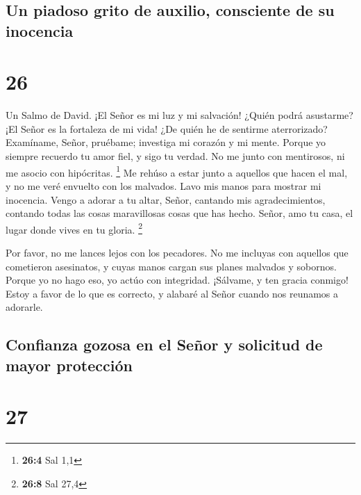 \hypertarget{un-piadoso-grito-de-auxilio-consciente-de-su-inocencia}{%
\subsection{Un piadoso grito de auxilio, consciente de su
inocencia}\label{un-piadoso-grito-de-auxilio-consciente-de-su-inocencia}}

\hypertarget{section-25}{%
\section{26}\label{section-25}}

Un Salmo de David.  ¡El Señor es mi luz y mi salvación!
¿Quién podrá asustarme? ¡El Señor es la fortaleza de mi vida! ¿De quién
he de sentirme aterrorizado?  Examíname, Señor, pruébame;
investiga mi corazón y mi mente.  Porque yo siempre recuerdo
tu amor fiel, y sigo tu verdad.  No me junto con mentirosos,
ni me asocio con hipócritas. \footnote{\textbf{26:4} Sal 1,1}
 Me rehúso a estar junto a aquellos que hacen el mal, y no
me veré envuelto con los malvados.  Lavo mis manos para
mostrar mi inocencia. Vengo a adorar a tu altar, Señor, 
cantando mis agradecimientos, contando todas las cosas maravillosas
cosas que has hecho.  Señor, amo tu casa, el lugar donde
vives en tu gloria. \footnote{\textbf{26:8} Sal 27,4}

 Por favor, no me lances lejos con los pecadores. No me
incluyas con aquellos que cometieron asesinatos,  y cuyas
manos cargan sus planes malvados y sobornos.  Porque yo no
hago eso, yo actúo con integridad. ¡Sálvame, y ten gracia conmigo!
 Estoy a favor de lo que es correcto, y alabaré al Señor
cuando nos reunamos a adorarle.

\hypertarget{confianza-gozosa-en-el-seuxf1or-y-solicitud-de-mayor-protecciuxf3n}{%
\subsection{Confianza gozosa en el Señor y solicitud de mayor
protección}\label{confianza-gozosa-en-el-seuxf1or-y-solicitud-de-mayor-protecciuxf3n}}

\hypertarget{section-26}{%
\section{27}\label{section-26}}


